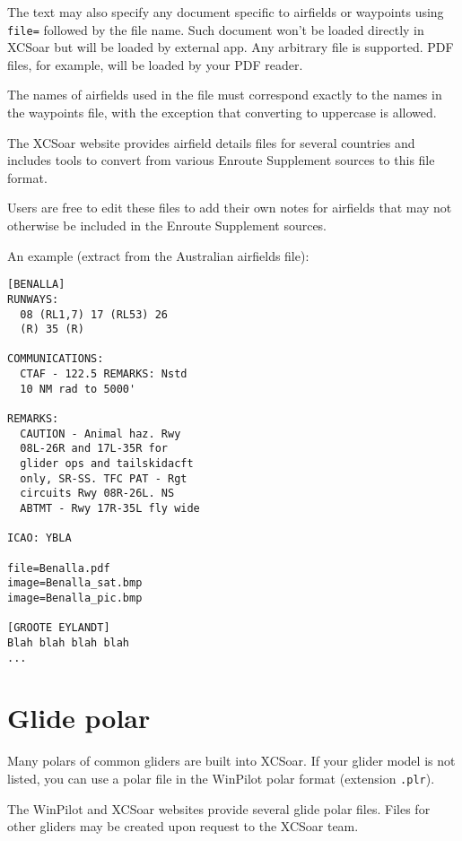 The text may also specify any document specific to airfields or waypoints using
\verb|file=| followed by the file name. Such document won't be loaded directly in XCSoar 
but will be loaded by external app. Any arbitrary file is supported. PDF files, for example,
will be loaded by your PDF reader.

The names of airfields used in the file must correspond exactly to the
names in the waypoints file, with the exception that converting to
uppercase is allowed.

The XCSoar website provides airfield details files for several
countries and includes tools to convert from various Enroute
Supplement sources to this file format.

Users are free to edit these files to add their own notes for
airfields that may not otherwise be included in the Enroute Supplement
sources.

An example (extract from the Australian airfields file):
\begin{verbatim}
[BENALLA]
RUNWAYS:
  08 (RL1,7) 17 (RL53) 26
  (R) 35 (R)

COMMUNICATIONS:
  CTAF - 122.5 REMARKS: Nstd
  10 NM rad to 5000'

REMARKS:
  CAUTION - Animal haz. Rwy
  08L-26R and 17L-35R for
  glider ops and tailskidacft
  only, SR-SS. TFC PAT - Rgt
  circuits Rwy 08R-26L. NS
  ABTMT - Rwy 17R-35L fly wide

ICAO: YBLA

file=Benalla.pdf
image=Benalla_sat.bmp
image=Benalla_pic.bmp

[GROOTE EYLANDT]
Blah blah blah blah
...
\end{verbatim}

\section{Glide polar} \label{sec:glide-polar}

Many polars of common gliders are built into XCSoar.  If your glider
model is not listed, you can use a polar file in the WinPilot polar
format (extension \verb|.plr|).

The WinPilot and XCSoar websites provide several glide polar files.
Files for other gliders may be created upon request to the XCSoar
team.

